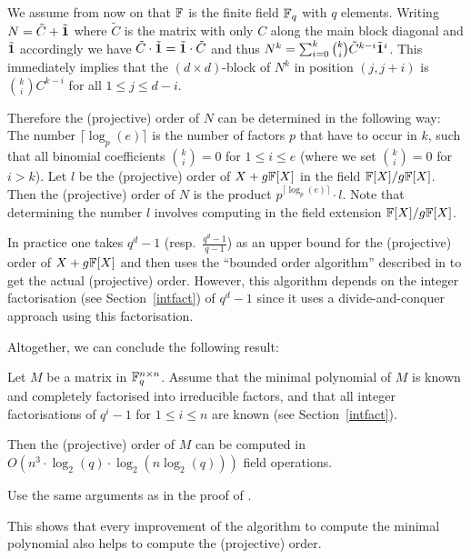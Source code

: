 We assume from now on that $\mathbb{F}$ is the finite field $\mathbb{F}_q$ with $q$
elements.
Writing $N = \tilde C + \tilde {\mathbf{1}}$ where $\tilde C$ is the matrix
with only $C$ along the main block diagonal and $\tilde {\mathbf{1}}$
accordingly we have $\tilde C \cdot \tilde {\mathbf{1}} = \tilde {\mathbf{1}} \cdot \tilde C$
and thus $N^k = \sum_{i=0}^k {k \choose i} \tilde C^{k-i} \tilde
{\mathbf{1}}^i$. This immediately implies that the $(d \times d)$-block
of $N^k$ in position $(j,j+i)$ is ${k \choose i}C^{k-i}$ for all
$1 \le j \le d-i$. 

Therefore the (projective) order of $N$ can be determined in the
following way: The number $\lceil \log_p(e)\rceil$ is the number
of factors $p$ that have to occur in $k$, such that all binomial
coefficients ${k \choose i} = 0$ for $1 \le i \le e$ (where we set ${k
\choose i} = 0$ for $i > k$). Let $l$ be the (projective) order of
$X+g\mathbb{F}[X]$ in the field $\mathbb{F}[X]/g\mathbb{F}[X]$. Then the (projective) order of
$N$ is the product $p^{\lceil \log_p(e) \rceil} \cdot l$. Note that
determining the number $l$ involves computing in the field extension
$\mathbb{F}[X]/g\mathbb{F}[X]$.

In practice one takes $q^d-1$ (resp.~$\frac{q^d-1}{q-1}$) as an upper bound
for the (projective) order of $X+g\mathbb{F}[X]$ and then uses the ``bounded order
algorithm'' described in \cite[Section 2]{CellLeedOrder} to get the
actual (projective) order. However, this algorithm depends on the
integer factorisation (see Section~\ref{intfact}) 
of $q^d-1$ since it uses a divide-and-conquer
approach using this factorisation.

Altogether, we can conclude the following result:

\begin{Prop}
Let $M$ be a matrix in $\mathbb{F}_q^{n \times n}$. Assume that the 
minimal polynomial of $M$ is known and completely factorised into
irreducible factors, and that all integer factorisations of $q^i-1$
for $1 \le i \le n$ are known (see Section~\ref{intfact}). 

Then the (projective) order of $M$ can be
computed in $O(n^3 \cdot \log_2(q) \cdot \log_2(n\log_2(q)))$
field operations.
\end{Prop}
\proofbeg Use the same arguments as in the proof of 
\cite[\textsc{Order Algorithm}]{CellLeedOrder}. 
\proofend

\begin{Rem}
This shows that every improvement of the algorithm to compute the
minimal polynomial also helps to compute the (projective) order.
\end{Rem}

